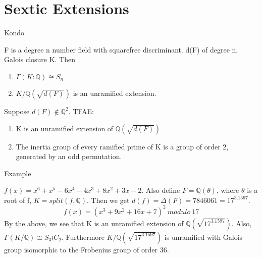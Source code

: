 \documentclass[10pt]{beamer}
\theoremstyle{plain} %
\begin{document}
\section{Sextic Extensions}
\begin{frame}{Kondo}
    \begin{theorem}
   F is a degree n number field with squarefree discriminant.  d(F) of degree n, Galois closure K. Then \begin{enumerate}
        \item $\Gamma(K:\mathbb{Q})\cong S_n$
        \item $K/\mathbb{Q}(\sqrt{d(F)})$ is an unramified extension.
    \end{enumerate}
\end{theorem}
\begin{lemma}
Suppose $d(F)\notin \mathbb{Q}^2$. TFAE:
\begin{enumerate}
    \item K is an unramified extension of $\mathbb{Q}(\sqrt{d(F)})$
    \item The inertia group of every ramified prime of K is a group of order 2, generated by an odd permutation. 
\end{enumerate}
\end{lemma} 
\end{frame}
\begin{frame}{Example}
\begin{example}
 $f(x)=x^6 + x^5 - 6x^4 - 4x^3 + 8x^2 + 3x - 2$. Also define $F=\mathbb{Q}(\theta)$, where $\theta$ is a root of f, $K=split(f,\mathbb{Q})$. Then we get $d(f)=\Delta(F)=7846061=17^3.1597$. 
\begin{equation}
   f(x)= (x^3 + 9x^2 + 16x + 7)^2\:modulo\:17
\end{equation}
By the above, we see that K is an unramified extension of $\mathbb{Q}(\sqrt{17^3.1597})$. Also, $\Gamma(K/\mathbb{Q})\cong S_3 \wr C_2$. Furthermore $K/\mathbb{Q}(\sqrt{17^3.1597})$ is unramified with Galois group isomorphic to the Frobenius group of order 36.
\end{example}    
\end{frame}
\end{document}
